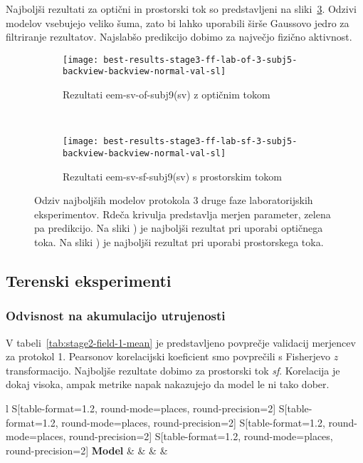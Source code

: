 Najboljši rezultati za optični in prostorski tok so predstavljeni na sliki~\ref{fig:lab-3}. Odzivi modelov vsebujejo veliko šuma, zato bi lahko uporabili širše Gaussovo jedro za filtriranje rezultatov. Najslabšo predikcijo dobimo za največjo fizično aktivnost.

\begin{figure}[!htbp]
	\centering
	\begin{subfigure}[t]{0.45\columnwidth}
		\texttt{[image: best-results-stage3-ff-lab-of-3-subj5-backview-backview-normal-val-sl]}
		\caption{Rezultati eem-sv-of-subj9(sv) z optičnim tokom}
		\label{fig:lab-of-3}
	\end{subfigure}
	~
	\begin{subfigure}[t]{0.45\columnwidth}
		\texttt{[image: best-results-stage3-ff-lab-sf-3-subj5-backview-backview-normal-val-sl]}
		\caption{Rezultati eem-sv-sf-subj9(sv) s prostorskim tokom}
		\label{fig:lab-sf-3}
	\end{subfigure}
	\caption[Odziv SUBJ9 modelov protokola 3 faze 2 lab. eksperimentov]{Odziv najboljših modelov protokola 3 druge faze laboratorijskih eksperimentov. Rdeča krivulja predstavlja merjen parameter, zelena pa predikcijo. Na sliki ) je najboljši rezultat pri uporabi optičnega toka. Na sliki ) je najboljši rezultat pri uporabi prostorskega toka.}
	\label{fig:lab-3}
\end{figure}

\subsection{Terenski eksperimenti}
\subsubsection{Odvisnost na akumulacijo utrujenosti}
V tabeli~\ref{tab:stage2-field-1-mean} je predstavljeno povprečje validacij merjencev za protokol 1. Pearsonov korelacijski koeficient \corr smo povprečili s Fisherjevo $z$ transformacijo. Najboljše rezultate dobimo za prostorski tok \textit{sf}. Korelacija je dokaj visoka, ampak metrike napak nakazujejo da model le ni tako dober.

\begin{table}[!htbp]
	\centering
	\begin{tabular}{l S[table-format=1.2, round-mode=places, round-precision=2] S[table-format=1.2, round-mode=places, round-precision=2] S[table-format=1.2, round-mode=places, round-precision=2] S[table-format=1.2, round-mode=places, round-precision=2]}
		\toprule
		\textbf{Model} & \thead{\corr} & \thead{\rae} & \thead{\rrse} & \theadm{\nsv}\\
		\midrule
		\bottomrule
	\end{tabular}
	\caption[Povprečje validacij merjencev za protokol 1 2. faze terenskih eksperimentov]{Povprečje validacij merjencev za protokol 1 druge faze terenskih eksperimentov. Pearsonov korelacijski koeficient (CORR) smo povprečili s Fisherjevo $z$ transformacijo.}
	\label{tab:stage2-field-1-mean}
\end{table}

